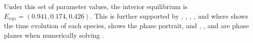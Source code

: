 Under this set of parameter values, the interior equilibrium is $E_{xyz}=(0.941,0.174,0.426)$. This is further supported by , , , , and  where  shows the time evolution of each species,  shows the phase portrait, and , , and  are phase planes when numerically solving .
